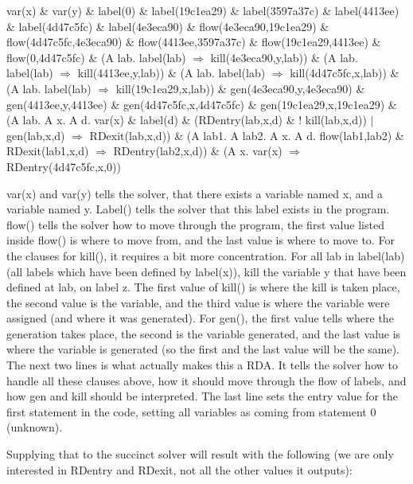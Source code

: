 var(x) \& var(y) \&\newline
label(0) \& label(19c1ea29) \& label(3597a37c) \& label(4413ee) \& label(4d47c5fc) \& label(4e3eca90) \&\newline
flow(4e3eca90,19c1ea29) \& flow(4d47c5fc,4e3eca90) \& flow(4413ee,3597a37c) \& flow(19c1ea29,4413ee) \& flow(0,4d47c5fc) \&\newline
(A lab. label(lab) $\Rightarrow$ kill(4e3eca90,y,lab)) \& (A lab. label(lab) $\Rightarrow$ kill(4413ee,y,lab)) \& (A lab. label(lab) $\Rightarrow$ kill(4d47c5fc,x,lab)) \& (A lab. label(lab) $\Rightarrow$ kill(19c1ea29,x,lab)) \&\newline
gen(4e3eca90,y,4e3eca90) \& gen(4413ee,y,4413ee) \& gen(4d47c5fc,x,4d47c5fc) \& gen(19c1ea29,x,19c1ea29) \&\newline
(A lab. A x. A d. var(x) \& label(d) \& (RDentry(lab,x,d) \& ! kill(lab,x,d)) $|$ gen(lab,x,d) $\Rightarrow$ RDexit(lab,x,d)) \&\newline
(A lab1. A lab2. A x. A d. flow(lab1,lab2) \& RDexit(lab1,x,d) $\Rightarrow$ RDentry(lab2,x,d)) \&\newline
(A x. var(x) $\Rightarrow$ RDentry(4d47c5fc,x,0))

var(x) and var(y) tells the solver, that there exists a variable named x, and a variable named y. Label() tells the solver that this label exists in the program. flow() tells the solver how to move through the program, the first value listed inside flow() is where to move from, and the last value is where to move to. For the clauses for kill(), it requires a bit more concentration. For all lab in label(lab) (all labels which have been defined by label(x)), kill the variable y that have been defined at lab, on label z. The first value of kill() is where the kill is taken place, the second value is the variable, and the third value is where the variable were assigned (and where it was generated). For gen(), the first value tells where the generation takes place, the second is the variable generated, and the last value is where the variable is generated (so the first and the last value will be the same). The next two lines is what actually makes this a RDA. It tells the solver how to handle all these clauses above, how it should move through the flow of labels, and how gen and kill should be interpreted. The last line sets the entry value for the first statement in the code, setting all variables as coming from statement 0 (unknown).

Supplying that to the succinct solver will result with the following (we are only interested in RDentry and RDexit, not all the other values it outputs):

